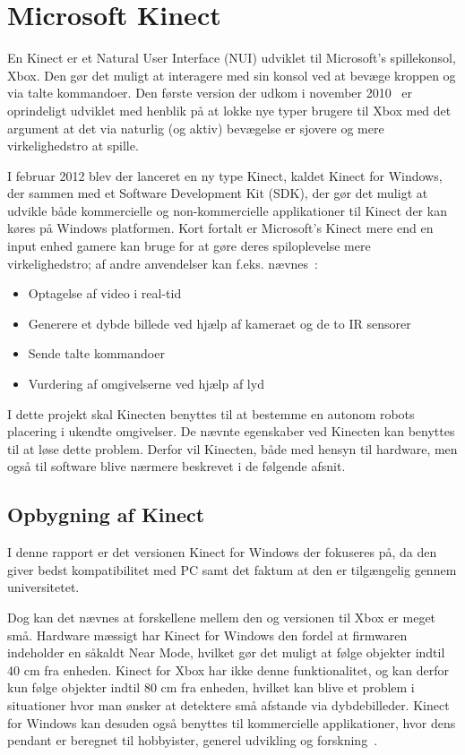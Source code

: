\section{Microsoft Kinect}
En Kinect er et Natural User Interface (NUI) udviklet til Microsoft's spillekonsol, Xbox.
Den gør det muligt at interagere med sin konsol ved at bevæge kroppen og via talte kommandoer.
Den første version der udkom i november 2010~\cite{kinectWiki} er oprindeligt udviklet med henblik på at lokke nye typer brugere til Xbox med det argument at det via naturlig (og aktiv) bevægelse er sjovere og mere virkelighedstro at spille.

I februar 2012 blev der lanceret en ny type Kinect, kaldet Kinect for Windows, der sammen med et Software Development Kit (SDK), der gør det muligt at udvikle både kommercielle og non-kommercielle applikationer til Kinect der kan køres på Windows platformen.
Kort fortalt er Microsoft's Kinect mere end en input enhed gamere kan bruge for at gøre deres spiloplevelse mere virkelighedstro; af andre anvendelser kan f.eks. nævnes~\cite[s.~17]{kinectProgrammingGuide}:

\begin{itemize}
\item Optagelse af video i real-tid
\item Generere et dybde billede ved hjælp af kameraet og de to IR sensorer
\item Sende talte kommandoer
\item Vurdering af omgivelserne ved hjælp af lyd
\end{itemize}

I dette projekt skal Kinecten benyttes til at bestemme en autonom robots placering i ukendte omgivelser. 
De nævnte egenskaber ved Kinecten kan benyttes til at løse dette problem.
Derfor vil Kinecten, både med hensyn til hardware, men også til software blive nærmere beskrevet i de følgende afsnit.


\subsection{Opbygning af Kinect}
I denne rapport er det versionen Kinect for Windows der fokuseres på, da den giver bedst kompatibilitet med PC samt det faktum at den er tilgængelig gennem universitetet.

Dog kan det nævnes at forskellene mellem den og versionen til Xbox er meget små.
Hardware mæssigt har Kinect for Windows den fordel at firmwaren indeholder en såkaldt Near Mode, hvilket gør det muligt at følge objekter indtil 40 cm fra enheden.
Kinect for Xbox har ikke denne funktionalitet, og kan derfor kun følge objekter indtil 80 cm fra enheden, hvilket kan blive et problem i situationer hvor man ønsker at detektere små afstande via dybdebilleder.
Kinect for Windows kan desuden også benyttes til kommercielle applikationer, hvor dens pendant er beregnet til hobbyister, generel udvikling og forskning~\cite[s.~16]{kinectProgrammingGuide}.

